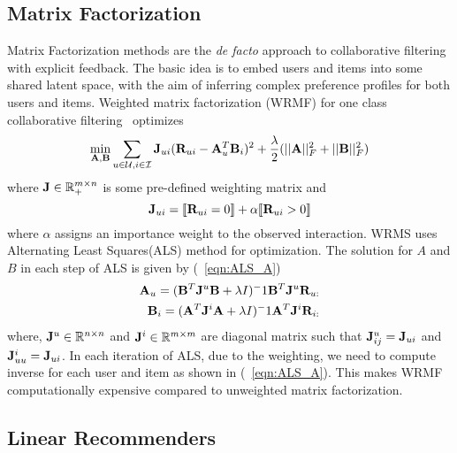 \subsection{Matrix Factorization}

Matrix Factorization methods are the \emph{de facto} approach to collaborative filtering with explicit feedback. The basic idea is to embed users and items into some shared latent space, with the aim of inferring complex preference profiles for both users and items. 
Weighted matrix factorization (WRMF) for one class collaborative filtering~\cite{Hu:2008, Pan:2009} optimizes
\begin{equation}
\label{eqn:wrmf}
\min_{ \mathbf{A},\mathbf{B}  } \sum_{ u \in \mathcal{U}, i \in \mathcal{I} } \mathbf{J}_{ui} ( \mathbf{R}_{ui} - \mathbf{A}_u^T \mathbf{B}_i )^2 + \frac{\lambda}{2}  ( ||\mathbf{A}||_F^2 + ||\mathbf{B}||_F^2 )
\end{equation}
where 
$\mathbf{J} \in \mathbb{R}_+^{m \times n}$ is some pre-defined weighting matrix  and 
\begin{equation}
\label{eqn:wrmf-weight}
\mathbf{J}_{ui} =  \llbracket  \mathbf{R}_{ui} = 0  \rrbracket + \alpha \llbracket  \mathbf{R}_{ui} > 0  \rrbracket 
\end{equation}
where $\alpha$ assigns an importance weight to the observed interaction.
WRMS uses Alternating Least Squares(ALS) method for optimization. The solution for $A$ and $B$ in each step of ALS is given by (~\ref{eqn:ALS_A})
\begin{align}
	\label{eqn:ALS_A}
	\begin{split}
	\mathbf{A}_u = (\mathbf{B}^T \mathbf{J}^u \mathbf{B} + \lambda I)^-1 \mathbf{B}^T \mathbf{J}^u \mathbf{R}_{u:} \\
	\mathbf{B}_i = (\mathbf{A}^T \mathbf{J}^i \mathbf{A} + \lambda I)^-1 \mathbf{A}^T \mathbf{J}^i \mathbf{R}_{i:} 
	\end{split}
\end{align}
where, $\mathbf{J}^u \in \mathbb{R}^{n \times n}$ and $\mathbf{J}^i \in \mathbb{R}^{m \times m}$ are diagonal matrix such that $ \mathbf{J}^u_{ij} = \mathbf{J}_{ui}$ and  $\mathbf{J}^i_{uu} = \mathbf{J}_{ui}$. In each iteration of ALS, due to the weighting, we need to compute inverse for each user and item as shown in (~\ref{eqn:ALS_A}). This makes WRMF computationally expensive compared to unweighted matrix factorization.


\subsection{Linear Recommenders}

